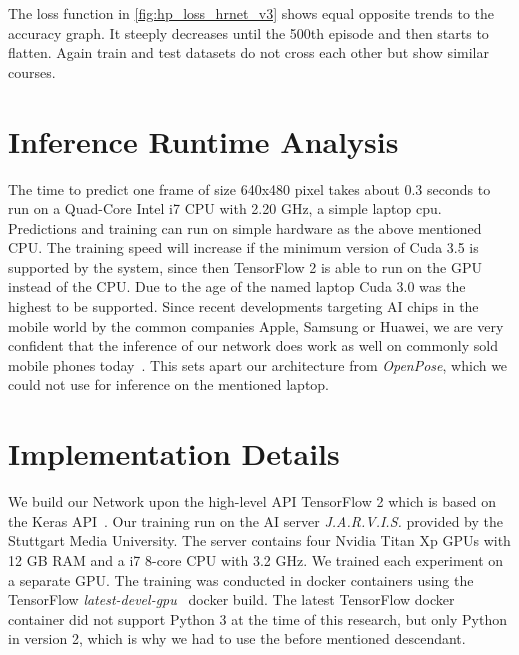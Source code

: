 The loss function in \autoref{fig:hp_loss_hrnet_v3} shows equal opposite trends to the accuracy graph.
It steeply decreases until the 500th episode and then starts to flatten.
Again train and test datasets do not cross each other but show similar courses.

\section{Inference Runtime Analysis}
The time to predict one frame of size 640x480 pixel takes about 0.3 seconds to run on a Quad-Core Intel i7 CPU with 2.20 GHz,
a simple laptop cpu.
Predictions and training can run on simple hardware as the above mentioned CPU.
The training speed will increase if the minimum version of Cuda
3.5 is supported by the system, since then TensorFlow 2 is able to run on the GPU instead of the CPU.
Due to the age of the named laptop Cuda 3.0 was the highest to be supported.
Since recent developments targeting AI chips in the mobile world by the common companies Apple, Samsung or Huawei,
we are very confident that the inference of our network does work as well on commonly sold mobile phones today~\cite{mobileAI}.
This sets apart our architecture from \textit{OpenPose}, which we could not use for inference on the mentioned laptop.

\section{Implementation Details}
We build our Network upon the high-level API TensorFlow 2 which is based on the Keras API~\cite{tensorflow2}.
Our training run on the AI server \textit{J.A.R.V.I.S.} provided by the Stuttgart Media University.
The server contains four Nvidia Titan Xp GPUs with 12 GB RAM and a i7 8-core CPU with 3.2 GHz.
We trained each experiment on a separate GPU. The training was conducted in docker containers using the TensorFlow
\textit{latest-devel-gpu}~\cite{tensorflowdocker} docker build.
The latest TensorFlow docker container did not support Python 3 at the time of this research, but only Python in version
2, which is why we had to use the before mentioned descendant.


